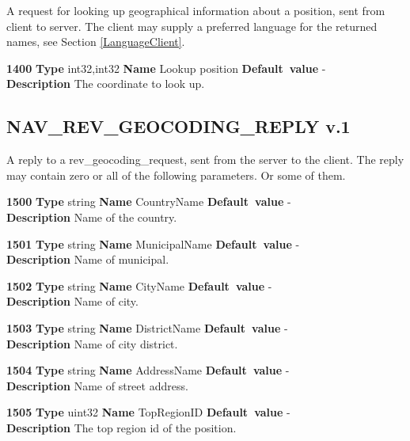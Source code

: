 \documentclass[a4paper]{article}
\begin{document}
A request for looking up geographical information about a position, sent
from client to server. The client may supply a preferred language for the
returned names, see Section \ref{LanguageClient}.

\begin{list}{\textbf{ParamID}}{}
\item \textbf{1400} \textbf{Type} int32,int32 \textbf{Name} Lookup position
                 \textbf{Default~value} - \\
  \label{Lookup position}
  \textbf{Description} The coordinate to look up.
\end{list}


\subsection{NAV\_REV\_GEOCODING\_REPLY v.1}

A reply to a rev\_geocoding\_request, sent from the server
to the client. The reply may contain zero or all of the following parameters.
Or some of them.
\begin{list}{\textbf{ParamID}}{}
\item \textbf{1500} \textbf{Type} string \textbf{Name} CountryName
                 \textbf{Default~value} - \\
  \label{CountryName}
  \textbf{Description} Name of the country.
\item \textbf{1501} \textbf{Type} string \textbf{Name} MunicipalName
                 \textbf{Default~value} - \\
  \label{MunicipalName}
  \textbf{Description} Name of municipal.
\item \textbf{1502} \textbf{Type} string \textbf{Name} CityName
                 \textbf{Default~value} - \\
  \label{CityName}
  \textbf{Description} Name of city.
\item \textbf{1503} \textbf{Type} string \textbf{Name} DistrictName
                 \textbf{Default~value} - \\
  \label{DistrictName}
  \textbf{Description} Name of city district.
\item \textbf{1504} \textbf{Type} string \textbf{Name} AddressName
                 \textbf{Default~value} - \\
  \label{AddressName}
  \textbf{Description} Name of street address.
\item \textbf{1505} \textbf{Type} uint32 \textbf{Name} TopRegionID
                 \textbf{Default~value} - \\
  \label{TopRegionID}
  \textbf{Description} The top region id of the position.
\end{list}
\end{document}
